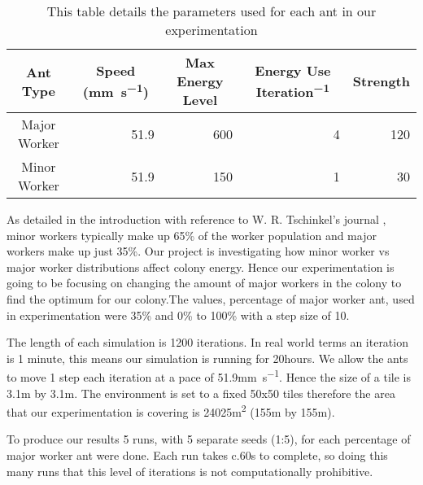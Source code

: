 \begin{table}[htb]
  \centering
  \caption{This table details the parameters used for each ant in our experimentation}
  \label{tab:ant-parameters}
  \begin{tabular}{@{}crrrr@{}}
  \toprule
  Ant Type     & \multicolumn{1}{c}{Speed (\si{mm.s^{-1}})} & \multicolumn{1}{c}{Max Energy Level} & \multicolumn{1}{c}{Energy Use \si{Iteration^{-1}}} & \multicolumn{1}{c}{Strength} \\ \midrule
  Major Worker & 51.9                             &  600                                    & 4     & 120                                    \\ \midrule
  Minor Worker & 51.9                              & 150                                     & 1    & 30                                     \\ \bottomrule
  \end{tabular}
\end{table}

As detailed in the introduction with reference to W. R. Tschinkel's journal \cite{Tschinkel1988}, minor workers typically make up 65\% of the worker population and major workers make up just 35\%. Our project is investigating how minor worker vs major worker distributions affect colony energy. Hence our experimentation is going to be focusing on changing the amount of major workers in the colony to find the optimum for our colony.The values, percentage of major worker ant, used in experimentation were 35\% and 0\% to 100\% with a step size of 10.\par
 The length of each simulation is 1200 iterations. In real world terms an iteration is 1 minute, this means our simulation is running for 20hours. We allow the ants to move 1 step each iteration at a pace of 51.9\si{mm.s^{-1}}. Hence the size of a tile is 3.1\si{m} by 3.1\si{m}. The environment is set to a fixed 50x50 tiles therefore the area that our experimentation is covering is 24025\si{m^2} (155\si{m} by 155\si{m}).\par
 To produce our results 5 runs, with 5 separate seeds (1:5), for each percentage of major worker ant were done. Each run takes c.60\si{s} to complete, so doing this many runs that this level of iterations is not computationally prohibitive.\par

